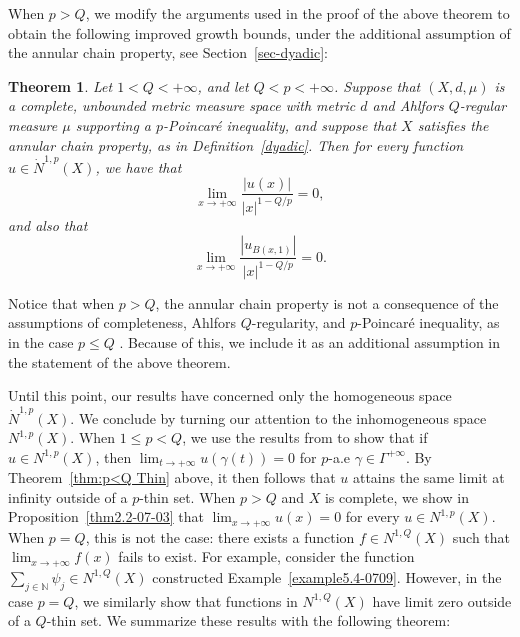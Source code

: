 \documentclass[10pt]{amsart}
\newtheorem{theorem}{Theorem}[section]
\numberwithin{equation}{section}
\begin{document}
When $p>Q$, we modify the arguments used in the proof of the above theorem to obtain the following improved growth bounds, under the additional assumption of the annular chain property, see Section~\ref{sec-dyadic}:
\begin{theorem}\label{thm:p>Q Growth}
Let $1<Q<+\infty$, and let $Q<p<+\infty$.  Suppose that $(X,d,\mu)$ is a complete, unbounded metric measure space with metric $d$ and Ahlfors $Q$-regular measure $\mu$ supporting a $p$-Poincar\'e inequality, and suppose that $X$ satisfies the annular chain property, as in Definition~\ref{dyadic}.  Then for every function $u\in\dot N^{1,p}(X)$, we have that 
\begin{equation}\label{eq:p>Q Growth 1}
\lim_{x\to+\infty}\frac{|u(x)|}{|x|^{{1-Q/p}}}=0,
\end{equation}
and also that 
\begin{equation}\label{eq:p>Q Growth 2}
\lim_{x\to+\infty}\frac{|u_{B(x,1)}|}{|x|^{1-Q/p}}=0.
\end{equation}  
\end{theorem}
Notice that when $p>Q$, the annular chain property is not a consequence of the assumptions of completeness, Ahlfors $Q$-regularity, and $p$-Poincar\'e inequality, as in the case $p\le Q$ \cite[Theorem~3.3]{K07}.  Because of this, we include it as an additional assumption in the statement of the above theorem.

Until this point, our results have concerned only the homogeneous space $\dot N^{1,p}(X)$.  We conclude by turning our attention to the inhomogeneous space $N^{1,p}(X)$.  When $1\le p<Q$, we use the results from \cite{KN22} to show that if $u\in N^{1,p}(X)$, then $\lim_{t\to+\infty}u(\gamma(t))=0$ for $p$-a.e $\gamma\in\Gamma^{+\infty}$.
By Theorem~\ref{thm:p<Q Thin} above, it then follows that $u$ attains the same limit at infinity outside of a $p$-thin set.  When $p>Q$ and $X$ is complete, we show in Proposition~\ref{thm2.2-07-03} that $\lim_{x\to+\infty} u(x)=0$ for every  $u\in N^{1,p}(X)$.  When $p=Q$, this is not the case: there exists a function $f\in N^{1,Q}(X)$ such that $\lim_{x\to+\infty}f(x)$ fails to exist. For example, consider the function $\sum_{j\in\mathbb N}\psi_j\in N^{1,Q}(X)$ constructed Example~\ref{example5.4-0709}.  However, in the case $p=Q$, we similarly show that functions in $N^{1,Q}(X)$ have limit zero outside of a $Q$-thin set.  We summarize these results with the following theorem:
\end{document}
